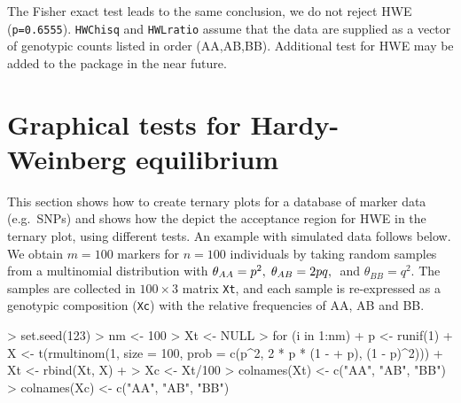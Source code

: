 \documentclass[a4paper]{article}
\begin{document}
The Fisher exact test leads to the same conclusion, we do not reject HWE ({\tt p=0.6555}).
{\tt HWChisq} and {\tt HWLratio} assume that the data are supplied as a vector of genotypic 
counts listed in order (AA,AB,BB). Additional test for HWE may be added to the package in the near future.

\section{Graphical tests for Hardy-Weinberg equilibrium}
\label{sec:graphical}

This section shows how to create ternary plots for a database of marker data (e.g.\ SNPs) and shows
how the depict the acceptance region for HWE in the ternary plot, using different tests. 
An example with simulated data follows below. We obtain $m=100$ markers for $n=100$ individuals
by taking random samples from a multinomial distribution with $\theta_{AA} = p^2, \hspace{1mm} \theta_{AB} = 2pq, 
\hspace{1mm}$ and $\theta_{BB} = q^2$. The samples are collected in $100 \times 3$ matrix {\tt Xt}, and each sample
is re-expressed as a genotypic composition ({\tt Xc}) with the relative frequencies of AA, AB and BB.

\begin{Schunk}
\begin{Sinput}
> set.seed(123)
> nm <- 100
> Xt <- NULL
> for (i in 1:nm) {
+     p <- runif(1)
+     X <- t(rmultinom(1, size = 100, prob = c(p^2, 2 * p * (1 - 
+         p), (1 - p)^2)))
+     Xt <- rbind(Xt, X)
+ }
> Xc <- Xt/100
> colnames(Xt) <- c("AA", "AB", "BB")
> colnames(Xc) <- c("AA", "AB", "BB")
\end{Sinput}
\end{Schunk}
\end{document}
